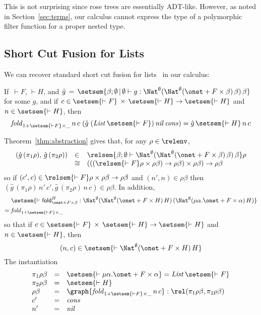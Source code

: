 \documentclass{lmcs}
\theoremstyle{plain}\newtheorem{satz}[thm]{Satz}
\newcommand{\fold}{\mathsf{fold}}
\begin{document}
\noindent
This is not surprising since rose trees are essentially
ADT-like. However, as noted in Section~\ref{sec:terms}, our calculus
cannot express the type of a polymorphic filter function for a proper
nested type.

\subsection{Short Cut Fusion for Lists}\label{sec:short-cut}

We can recover standard short cut fusion for lists~\cite{glp93} in our
calculus: 
\begin{thm}
If \,$\vdash F$, $\vdash H$, and 
$\hat{g} \, = \, \setsem{\beta; \emptyset \,|\, \emptyset \vdash g :
  \Nat^{\emptyset} (\Nat^{\emptyset} (\onet + F \times \beta)\,
  \beta)\, \beta}$ for some $g$, and if $c \in \setsem{\vdash F}
\,\times\, \setsem{\vdash H} \to \setsem{\vdash H}$ and $n \in
\setsem{\vdash H}$, then
\[\mathit{fold}_{1 + \setsem{\vdash F} \times \_}\, n\, c\; (\hat{g}\; (\mathit{List}\,
\setsem{\vdash F})\,\mathit{nil} \,\mathit{cons}) = \hat{g} \,\setsem{\vdash
  H}\, n\, c \]
\end{thm}
\proof
Theorem~\ref{thm:abstraction} gives
that, for any $\rho \in \relenv$,
\[\begin{array}{lll}
(\hat{g} \,(\pi_1 \rho), \,\hat{g}\, (\pi_2 \rho)) & \in 
& \relsem{\beta; \emptyset \vdash \Nat^{\emptyset} (\Nat^{\emptyset}
  (\onet + F \times \beta)\, \beta)\, \beta} \rho \\
& \cong & (((\relsem{\vdash F} \rho \times
\rho\beta) \to \rho\beta) \times \rho\beta) \to \rho\beta
\end{array}\]
so if $(c', c) \in \relsem{\vdash F} \rho \times
\rho\beta \to \rho\beta$ and $(n', n) \in \rho\beta$ then
$(\hat{g} \,(\pi_1 \rho)\, n'\, c', \hat{g}\, (\pi_2 \rho)\, n\, c)
\in \rho \beta$.
In addition,
\begin{align*}
  &\setsem{\vdash \fold_{\onet + F
    \times \beta}^{H} : \Nat^{\emptyset} (\Nat^{\emptyset} (\onet
  + F \times H)\, H)\, (\Nat^{\emptyset} (\mu \alpha. \onet
  + F \times \alpha)\, H)} \\ =\;
& \mathit{fold}_{1 + \setsem{\vdash F} \times \_}
\end{align*}
so that if $c \in
\setsem{\vdash F} \,\times\, \setsem{\vdash H} \to
\setsem{\vdash H}$ and $n \in \setsem{\vdash H}$,
 then
\[(n, c) \in \setsem{\vdash \Nat^{\emptyset} (\onet + F \times H)\,
  H}\] The instantiation
\[\begin{array}{lll}
\pi_1 \rho \beta & = & \setsem{\vdash \mu \alpha. \onet + F \times
  \alpha}=\mathit{List}\,\setsem{\vdash F}\\
\pi_2 \rho \beta & = & \setsem{\vdash H}\\
\rho \beta & = & \graph{\mathit{fold}_{1 + \setsem{\vdash F} \times \_}\, n\, c} :
\rel(\pi_1 \rho \beta, \pi_2 \rho \beta)\\
c' & = & \mathit{cons}\\
n' & = & \mathit{nil}
\end{array}\]
\end{document}
